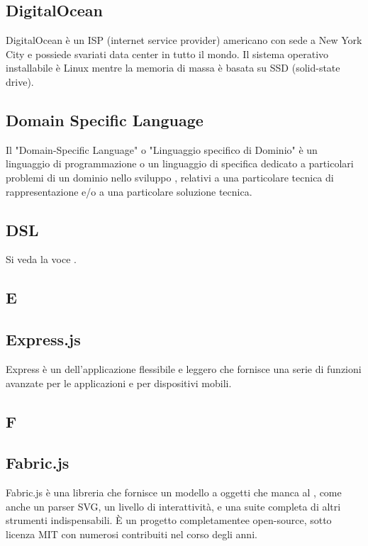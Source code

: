 \subsection{DigitalOcean}
DigitalOcean è un ISP (internet service provider) americano con sede a New York City e possiede svariati data center in tutto il mondo. Il sistema operativo installabile è Linux mentre la memoria di massa è basata su SSD (solid-state drive).

\subsection{Domain Specific Language}
Il "Domain-Specific Language" o "Linguaggio specifico di Dominio" è un linguaggio
di programmazione o un linguaggio di specifica dedicato a particolari
problemi di un dominio nello sviluppo , relativi a una particolare tecnica
di rappresentazione e/o a una particolare soluzione tecnica.

\subsection{DSL}
Si veda la voce .

\newpage

\begin{center}
\Huge\section{\uppercase{E}}
\end{center}

\subsection{Express.js}
Express è un  dell'applicazione   flessibile e leggero che fornisce una serie di funzioni avanzate per le applicazioni  e per dispositivi mobili.

\newpage

\begin{center}
\Huge\section{\uppercase{F}}
\end{center}

\subsection{Fabric.js}
Fabric.js è una libreria che fornisce un modello a oggetti che manca al , come anche un parser SVG, un livello di interattività, e una suite completa di altri strumenti indispensabili. È un progetto completamentee open-source, sotto licenza MIT con numerosi contribuiti nel corso degli anni.

